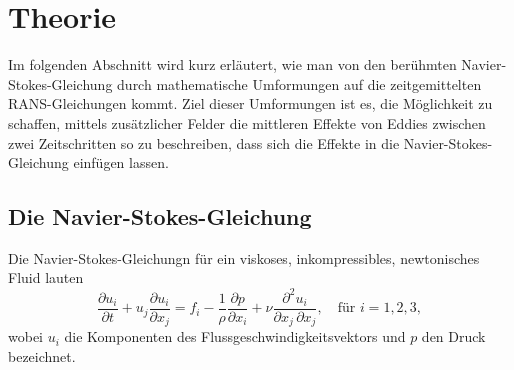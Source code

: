 %
%
%
%
\section{Theorie\label{reynolds:section:teil0}}
%
Im folgenden Abschnitt wird kurz erläutert, wie man von den berühmten Navier-Stokes-Gleichung
durch mathematische Umformungen auf die zeitgemittelten RANS-Gleichungen kommt.
%
Ziel dieser Umformungen ist es, die Möglichkeit zu schaffen, mittels zusätzlicher Felder
die mittleren Effekte von Eddies zwischen zwei Zeitschritten so zu beschreiben, dass sich die
Effekte in die Navier-Stokes-Gleichung einfügen lassen.
%
\subsection{Die Navier-Stokes-Gleichung}
%
Die Navier-Stokes-Gleichungn für ein viskoses, inkompressibles, newtonisches Fluid lauten
%
\begin{equation}
    \label{reynolds:eqs:impulse}
    \frac{\partial u_i}{\partial t} + u_j \frac{\partial u_i}{\partial x_j} =
        f_i - \frac{1}{\rho} \frac{\partial p}{\partial x_i} + 
        \nu \frac{\partial^2 u_i}{\partial x_j\, \partial x_j},\quad\text{für $i = 1,2,3$},
\end{equation}
%
wobei $u_i$ die Komponenten des Flussgeschwindigkeitsvektors und $p$ den Druck bezeichnet.


